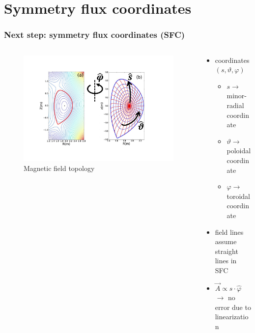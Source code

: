 \documentclass{beamer}
\begin{document}
\section{Symmetry flux coordinates}
\begin{frame}
\frametitle{Next step: symmetry flux coordinates (SFC)}
\vspace{-1 cm}
\begin{columns}[onlytextwidth]
	\begin{column}{0.5\textwidth}
		\begin{center}
			\begin{figure}
				\includegraphics[trim={2cm 3cm 5cm 2cm},clip,width=1\textwidth]{FIGURES/SFC_pdf1.pdf}
				\caption{Magnetic field topology}
			\end{figure}
		\end{center}
	\end{column}
	\begin{column}{0.5\textwidth}
		\vspace{0 cm}
		\begin{center}
			\begin{itemize}
				\item coordinates $(s,\vartheta,\varphi)$\\
							\begin{itemize}
					\item $s\rightarrow$ minor-radial coordinate
					\item $\vartheta \rightarrow$ poloidal coordinate
					\item $\varphi \rightarrow$ toroidal coordinate
				\end{itemize}
				\item field lines assume straight lines in SFC
				\item $\vec{A}\propto s\cdot\hat{\varphi}$
				$\rightarrow$ no error due to linearization
			\end{itemize}
		\end{center}
	\end{column}
\end{columns}
\end{frame}
\end{document}
